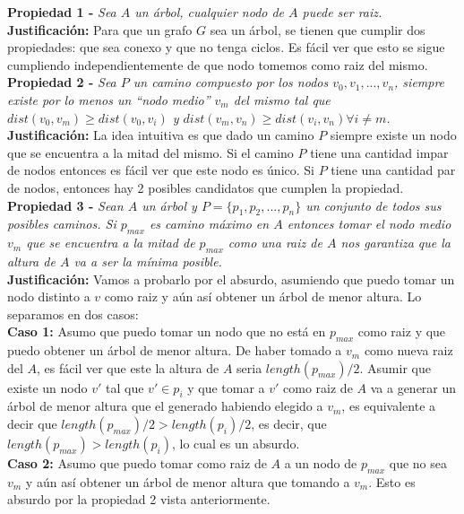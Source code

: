 \textbf{Propiedad 1 -}  \emph{Sea $A$ un árbol, cualquier nodo de $A$ puede ser raiz.}\\

\textbf{Justificación:} Para que un grafo $G$ sea un árbol, se tienen que cumplir dos propiedades: que sea conexo y que no tenga ciclos. Es fácil ver que esto se sigue cumpliendo independientemente de que nodo tomemos como raiz del mismo.\\

\textbf{Propiedad 2 -} \emph{Sea $P$ un camino compuesto por los nodos $v_0, v_1, ... , v_n$, siempre existe por lo menos un ``nodo medio'' $v_m$ del mismo tal que $dist(v_0, v_m) \geq dist(v_0, v_i)$ y $dist(v_m, v_n) \geq dist(v_i, v_n) \forall i \neq m$.}\\

\textbf{Justificación:} La idea intuitiva es que dado un camino $P$ siempre existe un nodo que se encuentra a la mitad del mismo. Si el camino $P$ tiene una cantidad impar de nodos entonces es fácil ver que este nodo es único. Si $P$ tiene una cantidad par de nodos, entonces hay 2 posibles candidatos que cumplen la propiedad.\\

\textbf{Propiedad 3 -}  \emph{Sean $A$ un árbol y $P = \{p_1, p_2, ... ,p_n\}$ un conjunto de todos sus posibles caminos. Si $p_{max}$ es camino máximo en $A$ entonces tomar el nodo medio $v_m$ que se encuentra a la mitad de $p_{max}$ como una raiz de $A$ nos garantiza que la altura de $A$ va a ser la mínima posible.}\\

\textbf{Justificación:} Vamos a probarlo por el absurdo, asumiendo que puedo tomar un nodo distinto a $v$ como raiz y aún así obtener un árbol de menor altura. Lo separamos en dos casos:\\

\textbf{Caso 1:} Asumo que puedo tomar un nodo que no está en $p_{max}$ como raiz y que puedo obtener un árbol de menor altura. De haber tomado a $v_m$ como nueva raiz del $A$, es fácil ver que este la altura de $A$ seria $length(p_{max})/2$. Asumir que existe un nodo $v'$ tal que $v' \in p_i$ y que tomar a $v'$ como raiz de $A$ va a generar un árbol de menor altura que el generado habiendo elegido a $v_m$, es equivalente a decir que $length(p_{max})/2 > length(p_i)/2$, es decir, que $length(p_{max}) > length(p_i)$, lo cual es un absurdo.\\

\textbf{Caso 2:} Asumo que puedo tomar como raiz de $A$ a un nodo de $p_{max}$ que no sea $v_m$ y aún así obtener un árbol de menor altura que tomando a $v_m$. Esto es absurdo por la propiedad 2 vista anteriormente.\\

